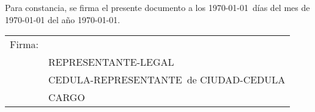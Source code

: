 \documentclass[11pt,a4paper]{letter} %
\def\Who{REPRESENTANTE-LEGAL} %
\def\What{CARGO} %
\def\CC{CEDULA-REPRESENTANTE}
\def\ciudadCC{CIUDAD-CEDULA}
\begin{document}
\begin{letter}
\begin{addmargin}[2em]{2em}
\end{addmargin}

\noindent Para constancia, se firma el presente documento a los \usrday\today \ días del mes de \hspace{-3.6em} \usrmonth\today \hspace{-1em} del año \usryear\today.

\closing{ }

\begin{tabular}{@{}p{0.7in}p{4in}@{}}
Firma: & \hrulefill \\
& \Who \\
& \CC\ de \ciudadCC \\
& \What \\
\end{tabular}


\end{letter}
\end{document}
